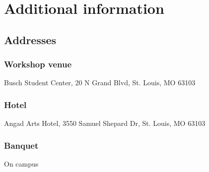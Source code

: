 \documentclass[12pt,letterpaper]{book}
\begin{document}
%
%
%

\chapter{Additional information}

\section{Addresses}

\subsection*{Workshop venue}
Busch Student Center, 20 N Grand Blvd, St. Louis, MO 63103
\subsection*{Hotel}
Angad Arts Hotel, 3550 Samuel Shepard Dr, St. Louis, MO 63103
\subsection*{Banquet}
On campus
\end{document}
